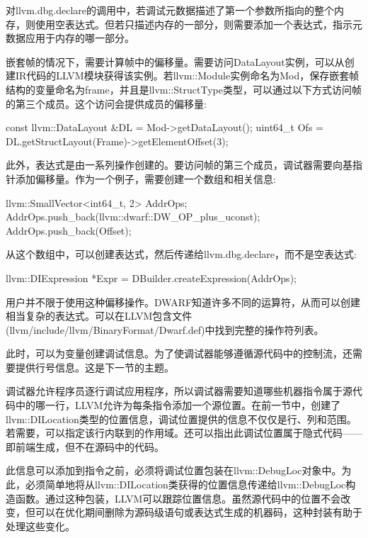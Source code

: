 对llvm.dbg.declare的调用中，若调试元数据描述了第一个参数所指向的整个内存，则使用空表达式。但若只描述内存的一部分，则需要添加一个表达式，指示元数据应用于内存的哪一部分。

嵌套帧的情况下，需要计算帧中的偏移量。需要访问DataLayout实例，可以从创建IR代码的LLVM模块获得该实例。若llvm::Module实例命名为Mod，保存嵌套帧结构的变量命名为frame，并且是llvm::StructType类型，可以通过以下方式访问帧的第三个成员。这个访问会提供成员的偏移量:

\begin{cpp}
const llvm::DataLayout &DL = Mod->getDataLayout();
uint64_t Ofs = DL.getStructLayout(Frame)->getElementOffset(3);
\end{cpp}

此外，表达式是由一系列操作创建的。要访问帧的第三个成员，调试器需要向基指针添加偏移量。作为一个例子，需要创建一个数组和相关信息:

\begin{cpp}
llvm::SmallVector<int64_t, 2> AddrOps;
AddrOps.push_back(llvm::dwarf::DW_OP_plus_uconst);
AddrOps.push_back(Offset);
\end{cpp}

从这个数组中，可以创建表达式，然后传递给llvm.dbg.declare，而不是空表达式:

\begin{cpp}
llvm::DIExpression *Expr = DBuilder.createExpression(AddrOps);
\end{cpp}

用户并不限于使用这种偏移操作。DWARF知道许多不同的运算符，从而可以创建相当复杂的表达式。可以在LLVM包含文件(llvm/include/llvm/BinaryFormat/Dwarf.def)中找到完整的操作符列表。

此时，可以为变量创建调试信息。为了使调试器能够遵循源代码中的控制流，还需要提供行号信息。这是下一节的主题。


调试器允许程序员逐行调试应用程序，所以调试器需要知道哪些机器指令属于源代码中的哪一行，LLVM允许为每条指令添加一个源位置。在前一节中，创建了llvm::DILocation类型的位置信息，调试位置提供的信息不仅仅是行、列和范围。若需要，可以指定该行内联到的作用域。还可以指出此调试位置属于隐式代码——即前端生成，但不在源码中的代码。

此信息可以添加到指令之前，必须将调试位置包装在llvm::DebugLoc对象中。为此，必须简单地将从llvm::DILocation类获得的位置信息传递给llvm::DebugLoc构造函数。通过这种包装，LLVM可以跟踪位置信息。虽然源代码中的位置不会改变，但可以在优化期间删除为源码级语句或表达式生成的机器码，这种封装有助于处理这些变化。

